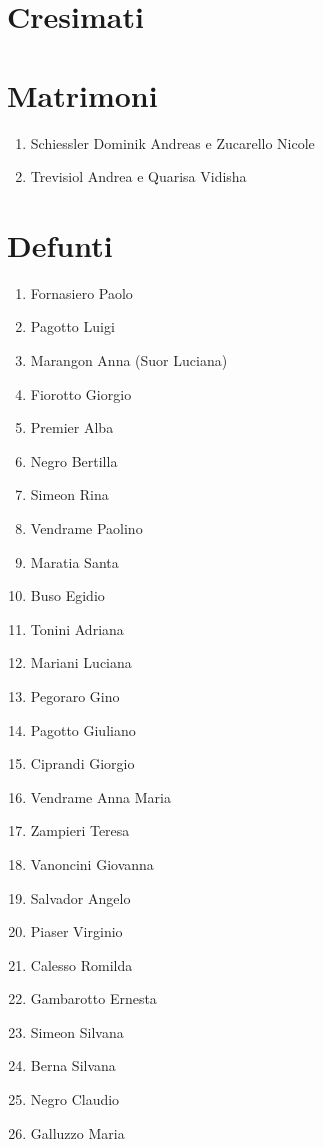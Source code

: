 \section{Cresimati}

\section{Matrimoni}
\begin{enumerate}
  \item Schiessler Dominik Andreas e Zucarello Nicole
  \item Trevisiol Andrea e Quarisa Vidisha
\end{enumerate}

\section{Defunti}
\begin{enumerate}
  \item Fornasiero Paolo
  \item Pagotto Luigi
  \item Marangon Anna (Suor Luciana)
  \item Fiorotto Giorgio
  \item Premier Alba
  \item Negro Bertilla
  \item Simeon Rina
  \item Vendrame Paolino
  \item Maratia Santa
  \item Buso Egidio
  \item Tonini Adriana
  \item Mariani Luciana
  \item Pegoraro Gino
  \item Pagotto Giuliano
  \item Ciprandi Giorgio
  \item Vendrame Anna Maria
  \item Zampieri Teresa
  \item Vanoncini Giovanna
  \item Salvador Angelo
  \item Piaser Virginio
  \item Calesso Romilda
  \item Gambarotto Ernesta
  \item Simeon Silvana
  \item Berna Silvana
  \item Negro Claudio
  \item Galluzzo Maria
\end{enumerate}

